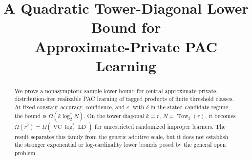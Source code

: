 \documentclass[11pt,letterpaper]{article}
\title{\LARGE A Quadratic Tower-Diagonal Lower Bound for\\Approximate-Private PAC Learning}
\author{}
\date{}
\providecommand{\VC}{\operatorname{VC}}
\providecommand{\LD}{\operatorname{LD}}
\begin{document}
\maketitle

\begin{abstract}
We prove a nonasymptotic sample lower bound for central approximate-private,
distribution-free realizable PAC learning of tagged products of finite
threshold classes.  At fixed constant accuracy, confidence, and
$\varepsilon$, with $\delta$ in the stated candidate regime, the bound is
$\Omega(k\log_2^*N)$.  On the tower diagonal
$k=r$, $N=\operatorname{Tow}_2(r)$, it becomes
$\Omega(r^2)=\Omega(\VC\log_2^*\LD)$ for unrestricted randomized improper
learners.  The result separates this family from the generic additive scale,
but it does not establish the stronger exponential or log-cardinality lower
bounds posed by the general open problem.
\end{abstract}






\newpage



\newpage

\end{document}
